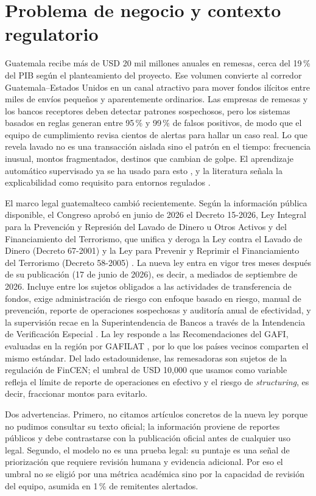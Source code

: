 \documentclass[11pt,a4paper]{article}
\begin{document}
\section{Problema de negocio y contexto regulatorio}
Guatemala recibe más de USD 20 mil millones anuales en remesas, cerca del 19\,\% del PIB según el planteamiento del proyecto. Ese volumen convierte al corredor Guatemala--Estados Unidos en un canal atractivo para mover fondos ilícitos entre miles de envíos pequeños y aparentemente ordinarios. Las empresas de remesas y los bancos receptores deben detectar patrones sospechosos, pero los sistemas basados en reglas generan entre 95\,\% y 99\,\% de falsos positivos, de modo que el equipo de cumplimiento revisa cientos de alertas para hallar un caso real. Lo que revela lavado no es una transacción aislada sino el patrón en el tiempo: frecuencia inusual, montos fragmentados, destinos que cambian de golpe. El aprendizaje automático supervisado ya se ha usado para esto \cite{jullum2020}, y la literatura señala la explicabilidad como requisito para entornos regulados \cite{kute2021}.

El marco legal guatemalteco cambió recientemente. Según la información pública disponible, el Congreso aprobó en junio de 2026 el Decreto 15-2026, Ley Integral para la Prevención y Represión del Lavado de Dinero u Otros Activos y del Financiamiento del Terrorismo, que unifica y deroga la Ley contra el Lavado de Dinero (Decreto 67-2001) y la Ley para Prevenir y Reprimir el Financiamiento del Terrorismo (Decreto 58-2005) \cite{infobae2026,pirani2026}. La nueva ley entra en vigor tres meses después de su publicación (17 de junio de 2026), es decir, a mediados de septiembre de 2026. Incluye entre los sujetos obligados a las actividades de transferencia de fondos, exige administración de riesgo con enfoque basado en riesgo, manual de prevención, reporte de operaciones sospechosas y auditoría anual de efectividad, y la supervisión recae en la Superintendencia de Bancos a través de la Intendencia de Verificación Especial \cite{pirani2026}. La ley responde a las Recomendaciones del GAFI, evaluadas en la región por GAFILAT \cite{fatf2012,gafilat2016}, por lo que los países vecinos comparten el mismo estándar. Del lado estadounidense, las remesadoras son sujetos de la regulación de FinCEN; el umbral de USD 10,000 que usamos como variable refleja el límite de reporte de operaciones en efectivo y el riesgo de \emph{structuring}, es decir, fraccionar montos para evitarlo.

Dos advertencias. Primero, no citamos artículos concretos de la nueva ley porque no pudimos consultar su texto oficial; la información proviene de reportes públicos y debe contrastarse con la publicación oficial antes de cualquier uso legal. Segundo, el modelo no es una prueba legal: su puntaje es una señal de priorización que requiere revisión humana y evidencia adicional. Por eso el umbral no se eligió por una métrica académica sino por la capacidad de revisión del equipo, asumida en 1\,\% de remitentes alertados.
\end{document}
